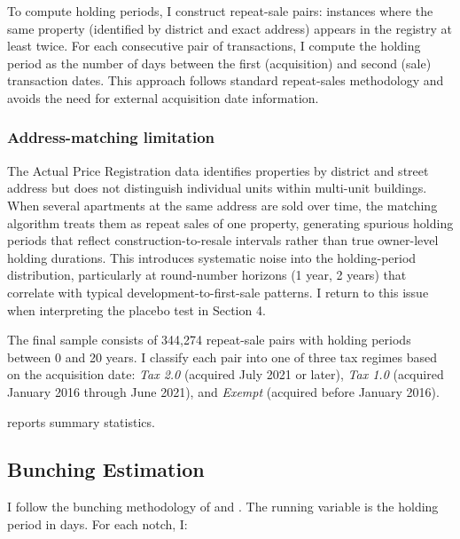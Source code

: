 \documentclass[12pt]{article}
\begin{document}
To compute holding periods, I construct repeat-sale pairs: instances where the same property (identified by district and exact address) appears in the registry at least twice. For each consecutive pair of transactions, I compute the holding period as the number of days between the first (acquisition) and second (sale) transaction dates. This approach follows standard repeat-sales methodology \citep{mian2013} and avoids the need for external acquisition date information.

\subsubsection*{Address-matching limitation} The Actual Price Registration data identifies properties by district and street address but does not distinguish individual units within multi-unit buildings. When several apartments at the same address are sold over time, the matching algorithm treats them as repeat sales of one property, generating spurious holding periods that reflect construction-to-resale intervals rather than true owner-level holding durations. This introduces systematic noise into the holding-period distribution, particularly at round-number horizons (1 year, 2 years) that correlate with typical development-to-first-sale patterns. I return to this issue when interpreting the placebo test in Section 4.

The final sample consists of 344,274 repeat-sale pairs with holding periods between 0 and 20 years. I classify each pair into one of three tax regimes based on the acquisition date: \textit{Tax 2.0} (acquired July 2021 or later), \textit{Tax 1.0} (acquired January 2016 through June 2021), and \textit{Exempt} (acquired before January 2016).

 reports summary statistics.



\subsection{Bunching Estimation}

I follow the bunching methodology of \citet{kleven2013} and \citet{kleven2016}. The running variable is the holding period in days. For each notch, I:
\end{document}
